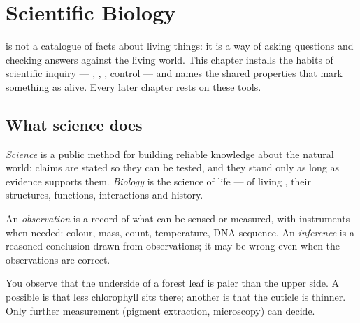 \chapter{Scientific Biology}\label{ch:g10:scientific-biology}

 is not a catalogue of facts about living things: it is a way
of asking questions and checking answers against the living world.
This chapter installs the habits of scientific inquiry --- ,
, , control --- and names the shared properties that
mark something as alive. Every later chapter rests on these tools.

\section{What science does}

\begin{definition}\label{def:g10:scientific-biology:science}
\emph{Science} is a public method for building reliable
knowledge about the natural world: claims are stated so they can be
tested, and they stand only as long as evidence supports them.
\emph{Biology} is the science of life --- of living
, their structures, functions, interactions and history.
\end{definition}

\begin{definition}\label{def:g10:scientific-biology:observation}
An \emph{observation} is a record of what can be
sensed or measured, with instruments when needed: colour, mass, count,
temperature, DNA sequence. An \emph{inference} is a
reasoned conclusion drawn from observations; it may be wrong even when
the observations are correct.
\end{definition}

\begin{example}\label{ex:g10:scientific-biology:obs}
You observe that the underside of a forest leaf is paler than the
upper side. A possible  is that less chlorophyll sits there;
another is that the cuticle is thinner. Only further measurement
(pigment extraction, microscopy) can decide.
\end{example}

